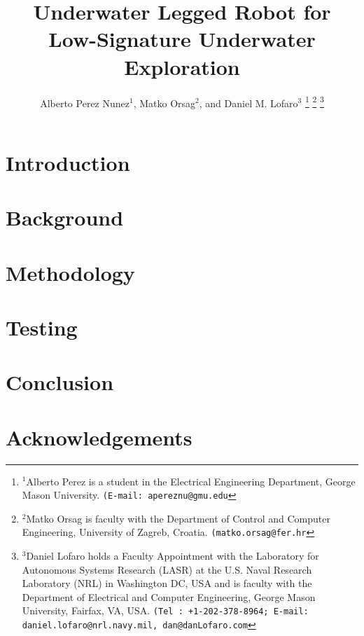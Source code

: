 \documentclass[letterpaper, 10 pt, conference]{ieeeconf}  %
\title{\LARGE \bf
Underwater Legged Robot for Low-Signature Underwater Exploration%
}
\author{Alberto Perez Nunez$^{1}$, Matko Orsag$^{2}$, and Daniel M. Lofaro$^{3}$%
\thanks{$^{1}$Alberto Perez is a student in the Electrical Engineering Department, George Mason University.
{\tt\small (E-mail: apereznu@gmu.edu}}%
\thanks{$^{2}$Matko Orsag is faculty with the Department of Control and Computer Engineering, University of Zagreb, Croatia.
	{\tt\small (matko.orsag@fer.hr}}%
\thanks{$^{3}$Daniel Lofaro holds a Faculty Appointment with the Laboratory for Autonomous Systems Research (LASR) at the U.S. Naval Research Laboratory (NRL) in Washington DC, USA and is faculty with the Department of Electrical and Computer Engineering, George Mason University, Fairfax, VA, USA.
	{\tt\small (Tel : +1-202-378-8964; E-mail: daniel.lofaro@nrl.navy.mil, dan@danLofaro.com}}%
}
\begin{document}
\maketitle
\thispagestyle{empty}
\pagestyle{empty}


\begin{abstract}

\end{abstract}


\section{Introduction}



\section{Background}\label{sec:background}


\section{Methodology}


\section{Testing}


%

\section{Conclusion}


\section*{Acknowledgements}





\end{document}
